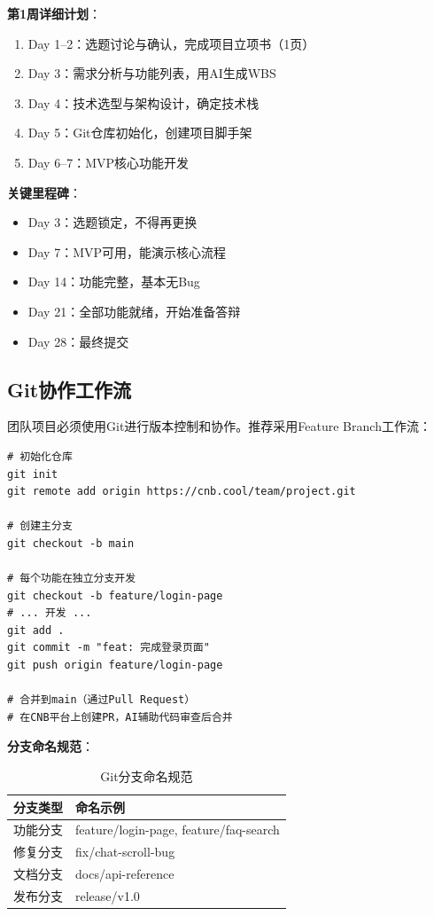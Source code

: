 \textbf{第1周详细计划}：

\begin{enumerate}[leftmargin=2em]
  \item Day 1--2：选题讨论与确认，完成项目立项书（1页）
  \item Day 3：需求分析与功能列表，用AI生成WBS
  \item Day 4：技术选型与架构设计，确定技术栈
  \item Day 5：Git仓库初始化，创建项目脚手架
  \item Day 6--7：MVP核心功能开发
\end{enumerate}

\textbf{关键里程碑}：

\begin{itemize}[leftmargin=2em]
  \item Day 3：选题锁定，不得再更换
  \item Day 7：MVP可用，能演示核心流程
  \item Day 14：功能完整，基本无Bug
  \item Day 21：全部功能就绪，开始准备答辩
  \item Day 28：最终提交
\end{itemize}

\subsection{Git协作工作流}

团队项目必须使用Git进行版本控制和协作。推荐采用Feature Branch工作流：

\begin{lstlisting}[style=shell]
# 初始化仓库
git init
git remote add origin https://cnb.cool/team/project.git

# 创建主分支
git checkout -b main

# 每个功能在独立分支开发
git checkout -b feature/login-page
# ... 开发 ...
git add .
git commit -m "feat: 完成登录页面"
git push origin feature/login-page

# 合并到main（通过Pull Request）
# 在CNB平台上创建PR，AI辅助代码审查后合并
\end{lstlisting}

\textbf{分支命名规范}：

\begin{table}[H]
\centering
\begin{tabular}{ll}
\toprule
\textbf{分支类型} & \textbf{命名示例} \\
\midrule
功能分支 & feature/login-page, feature/faq-search \\
修复分支 & fix/chat-scroll-bug \\
文档分支 & docs/api-reference \\
发布分支 & release/v1.0 \\
\bottomrule
\end{tabular}
\caption{Git分支命名规范}
\end{table}

